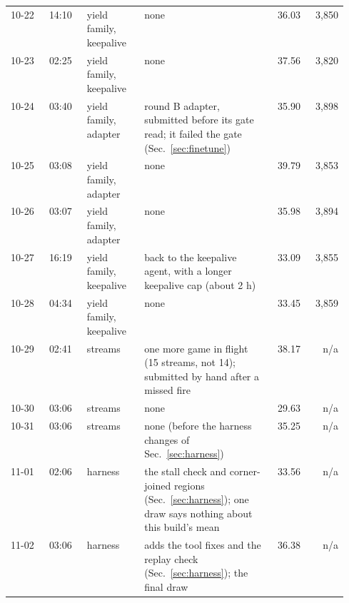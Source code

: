 \begin{table}[!p]
\begin{tabular}{@{}ll>{\raggedright\arraybackslash}p{0.17\linewidth}>{\raggedright\arraybackslash}p{0.38\linewidth}rr@{}}
10-22 & 14:10 & yield family, keepalive & none & 36.03 & 3,850 \\ %
10-23 & 02:25 & yield family, keepalive & none & 37.56 & 3,820 \\ %
10-24 & 03:40 & yield family, adapter & round B adapter, submitted before its gate read; it failed the gate (Sec.~\ref{sec:finetune}) & 35.90 & 3,898 \\ %
10-25 & 03:08 & yield family, adapter & none & 39.79 & 3,853 \\ %
10-26 & 03:07 & yield family, adapter & none & 35.98 & 3,894 \\ %
10-27 & 16:19 & yield family, keepalive & back to the keepalive agent, with a longer keepalive cap (about 2 h) & 33.09 & 3,855 \\ %
10-28 & 04:34 & yield family, keepalive & none & 33.45 & 3,859 \\ %
10-29 & 02:41 & 15 streams & one more game in flight (15 streams, not 14); submitted by hand after a missed fire & 38.17 & n/a \\ %
10-30 & 03:06 & 15 streams & none & 29.63 & n/a \\ %
10-31 & 03:06 & 15 streams & none (before the harness changes of Sec.~\ref{sec:harness}) & 35.25 & n/a \\ %
11-01 & 02:06 & harness & the stall check and corner-joined regions (Sec.~\ref{sec:harness}); one draw says nothing about this build's mean & 33.56 & n/a \\ %
11-02 & 03:06 & harness & adds the tool fixes and the replay check (Sec.~\ref{sec:harness}); the final draw & 36.38 & n/a \\ %
\bottomrule
\end{tabular}
\end{table}

